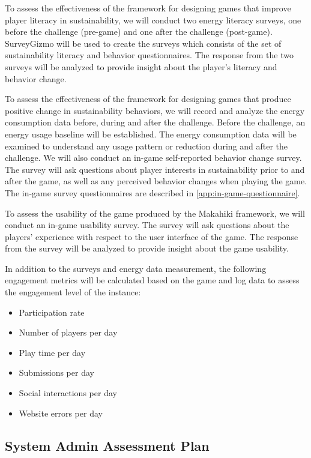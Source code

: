 To assess the effectiveness of the framework for designing games that improve player literacy in sustainability, we will 
conduct two energy literacy surveys, one before the challenge (pre-game) and one after
the challenge (post-game). SurveyGizmo will be used to create the surveys which consists of the set of sustainability literacy and behavior questionnaires. The response from the two surveys will be analyzed to provide insight about the player's literacy and behavior change. 

To assess the effectiveness of the framework for designing games that produce positive change in sustainability
behaviors, we will record and analyze the energy consumption data before, during and after the
challenge.  Before the challenge, an energy usage baseline will be established. The energy consumption data will be examined to understand any usage pattern or reduction during and after the challenge.  We will also conduct an in-game self-reported behavior change survey. The survey will ask questions about player interests in sustainability prior to and after the game, as well as any perceived behavior changes when playing the game. The in-game survey questionnaires are described in \autoref{app:in-game-questionnaire}.

To assess the usability of the game produced by the Makahiki framework, we will conduct an in-game usability survey. The survey will ask questions about the players' experience with respect to the user interface of the game. The response from the survey will be analyzed to provide insight about the game usability. 

In addition to the surveys and energy data measurement, the following engagement metrics will be calculated based on the game and log data to assess the engagement level of the instance:

\begin{itemize}
\item Participation rate
\item Number of players per day
\item Play time per day
\item Submissions per day
\item Social interactions per day
\item Website errors per day
\end{itemize}

\subsection{System Admin Assessment Plan}

